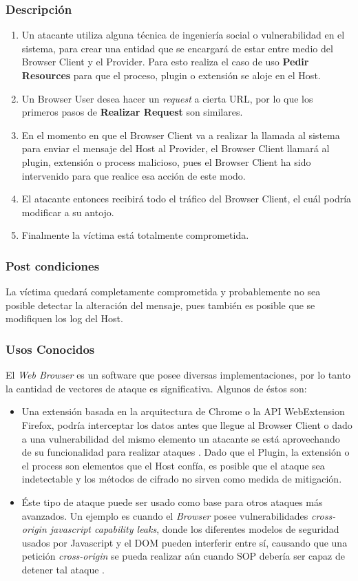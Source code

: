	\subsubsection{Descripción}
			\begin{enumerate}
				\item Un atacante utiliza alguna técnica de ingeniería social o vulnerabilidad en el sistema, para crear una entidad que se encargará de estar entre medio del Browser Client y el Provider. Para esto realiza el caso de uso \textbf{Pedir Resources} para que el proceso, plugin o extensión se aloje en el Host.
				\item Un Browser User desea hacer un \textit{request} a cierta URL, por lo que los primeros pasos de \textbf{Realizar Request} son similares.
				\item En el momento en que el Browser Client va a realizar la llamada al sistema para enviar el mensaje del Host al Provider, el Browser Client llamará al plugin, extensión o process malicioso, pues el Browser Client ha sido intervenido para que realice esa acción de este modo.
				\item El atacante entonces recibirá todo el tráfico del Browser Client, el cuál podría modificar a su antojo.
				\item Finalmente la víctima está totalmente comprometida.
			\end{enumerate}
	\subsubsection{Post condiciones} La víctima quedará completamente comprometida y probablemente no sea posible detectar la alteración del mensaje, pues también es posible que se modifiquen los log del Host.
	\subsubsection{Usos Conocidos} El \textit{Web Browser} es un software que posee diversas implementaciones, por lo tanto la cantidad de vectores de ataque es significativa. Algunos de éstos son:
			\begin{itemize}
				\item  Una extensión basada en la arquitectura de Chrome o la API WebExtension Firefox, podría interceptar los datos antes que llegue al Browser Client \cite{Paola2006} o dado a una vulnerabilidad del mismo elemento un atacante se está aprovechando de su funcionalidad para realizar ataques \cite{Liu2012, Barth2010}. Dado que el Plugin, la extensión o el process son elementos que el Host confía, es posible que el ataque sea indetectable y los métodos de cifrado no sirven como medida de mitigación.
				\item Éste tipo de ataque puede ser usado como base para otros ataques más avanzados. Un ejemplo es cuando el \textit{Browser} posee vulnerabilidades \textit{cross-origin javascript capability leaks}, donde los diferentes modelos de seguridad usados por Javascript y el DOM pueden interferir entre sí, causando que una petición \textit{cross-origin} se pueda realizar aún cuando SOP debería ser capaz de detener tal ataque \cite{Barth2009}.
			\end{itemize}


